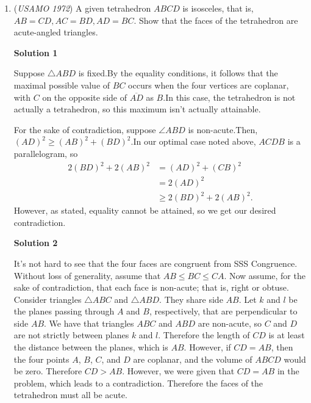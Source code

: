 \begin{enumerate}
 <i>Alternate solutions are always welcome. If you have a different, elegant solution to this problem, please \href{https://artofproblemsolving.com/wiki/index.php?title=1972\_USAMO\_Problems/Problem\_1&action=edit}{add it} to this page.</i>



	\item (\textit{USAMO 1972}) A given tetrahedron $ABCD$ is isosceles, that is, $AB=CD, AC=BD, AD=BC$. Show that the faces of the tetrahedron are acute-angled triangles.


 



\textbf{Solution 1}

Suppose $\triangle ABD$ is fixed.By the equality conditions, it follows that the maximal possible value of $BC$ occurs when the four vertices are coplanar, with $C$ on the opposite side of $\overline{AD}$ as $B$.In this case, the tetrahedron is not actually a tetrahedron, so this maximum isn't actually attainable.

 For the sake of contradiction, suppose $\angle ABD$ is non-acute.Then, $(AD)^2\geq (AB)^2+(BD)^2$.In our optimal case noted above, $ACDB$ is a parallelogram, so
 \begin{align*} 2(BD)^2 + 2(AB)^2 &= (AD)^2 + (CB)^2 \\ &= 2(AD)^2 \\ &\geq 2(BD)^2+2(AB)^2.  \end{align*}
However, as stated, equality cannot be attained, so we get our desired contradiction.

 



\textbf{Solution 2}

It's not hard to see that the four faces are congruent from SSS Congruence. Without loss of generality, assume that $AB\leq BC \leq CA$. Now assume, for the sake of contradiction, that each face is non-acute; that is, right or obtuse. Consider triangles $\triangle ABC$ and $\triangle ABD$. They share side $AB$. Let $k$ and $l$ be the planes passing through $A$ and $B$, respectively, that are perpendicular to side $AB$. We have that triangles $ABC$ and $ABD$ are non-acute, so $C$ and $D$ are not strictly between planes $k$ and $l$. Therefore the length of $CD$ is at least the distance between the planes, which is $AB$. However, if $CD=AB$, then the four points $A$, $B$, $C$, and $D$ are coplanar, and the volume of $ABCD$ would be zero. Therefore $CD>AB$. However, we were given that $CD=AB$ in the problem, which leads to a contradiction. Therefore the faces of the tetrahedron must all be acute.


\end{enumerate}
